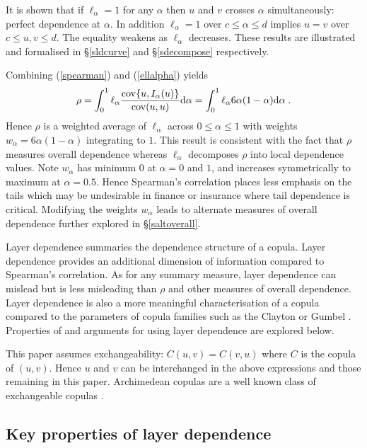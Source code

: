 \documentclass[authoryear]{elsarticle}
\newcommand{\cov}{{\rm cov}}
\newcommand{\de}{\mathrm{d}}
\newcommand{\eref}[1]{(\ref{#1})}
\newcommand{\sref}[1]{\S\ref{#1}}
\begin{document}
It is shown that if $\ell_\alpha=1$ for any $\alpha$ then $u$ and $v$ crosses $\alpha$ simultaneously: perfect dependence at $\alpha$. In addition $\ell_\alpha=1$ over $c\le\alpha\le d$ implies $u=v$ over $c\le u,v\le d$. The equality weakens as $\ell_\alpha$ decreases. These results are illustrated and formalised in \sref{sldcurve} and \sref{sdecompose} respectively.

Combining \eref{spearman} and \eref{ellalpha} yields
\begin{equation}\label{wtdavg}
\rho = \int_0^1 \ell_\alpha \frac{\cov\{u,I_\alpha(u)\}}{\cov(u,u)} \de \alpha =  \int_0^1 \ell_\alpha 6\alpha(1-\alpha) \de \alpha \; .
\end{equation}
Hence $\rho$ is a weighted average of $\ell_\alpha$ across $0\le\alpha\le 1$ with weights $w_\alpha=6\alpha(1-\alpha)$ integrating to $1$. This result is consistent with the fact that $\rho$ measures overall dependence whereas $\ell_\alpha$ decomposes $\rho$ into local dependence values. Note $w_\alpha$ has minimum $0$ at $\alpha=0$ and $1$, and increases symmetrically to maximum at $\alpha=0.5$. Hence Spearman's correlation places less emphasis on the tails which may be undesirable in finance or insurance where tail dependence is critical. Modifying the weights $w_\alpha$ leads to alternate measures of overall dependence further explored in \sref{saltoverall}.


Layer dependence summaries the dependence structure of a copula. Layer dependence provides an additional dimension of information compared to Spearman's correlation. As for any summary measure, layer dependence can mislead but is less misleading than $\rho$ and other measures of overall dependence. Layer dependence is also a more meaningful characterisation of a copula compared to the parameters of copula families such as the Clayton or Gumbel \citep{mcneil2005qrm}. Properties of and arguments for using layer dependence are explored below.


This paper assumes exchangeability: $C(u,v)=C(v,u)$ where $C$ is the copula of $(u,v)$. Hence $u$ and $v$ can be interchanged in the above expressions and those remaining in this paper. Archimedean copulas are a well known class of exchangeable copulas \citep{mcneil2005qrm}.



\subsection{Key properties of layer dependence}
\end{document}
